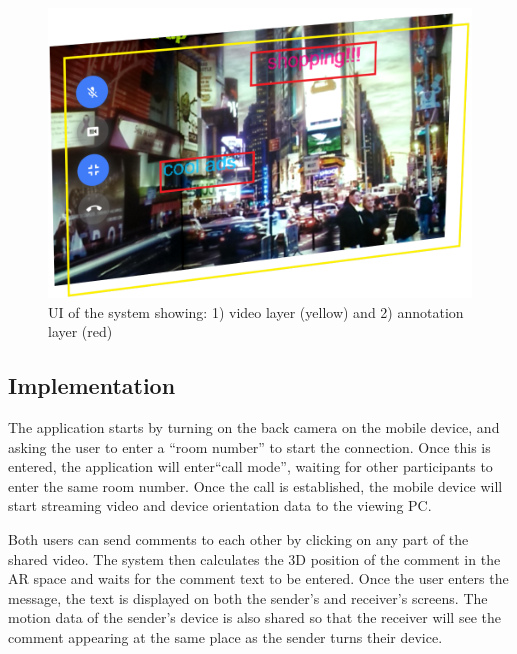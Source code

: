 \begin{figure}[h]
  \centering
  \includegraphics[width=.8\linewidth]{images/mgia16/layers.png}
  \caption{UI of the system showing: 1) video layer (yellow) and 2) annotation layer (red)}
	\label{fig:mgia16:layers}
\end{figure}

\subsection{Implementation}

The application starts by turning on the back camera on the mobile device, and asking the user to enter a “room number” to start the connection. Once this is entered, the application will enter``call mode'', waiting for other participants to enter the same room number. Once the call is established, the mobile device will start streaming video and device orientation data to the viewing PC. 

Both users can send comments to each other by clicking on any part of the shared video. The system then calculates the 3D position of the comment in the AR space and waits for the comment text to be entered. Once the user enters the message, the text is displayed on both the sender's and receiver's screens. The motion data of the sender's device is also shared so that the receiver will see the comment appearing at the same place as the sender turns their device. 


